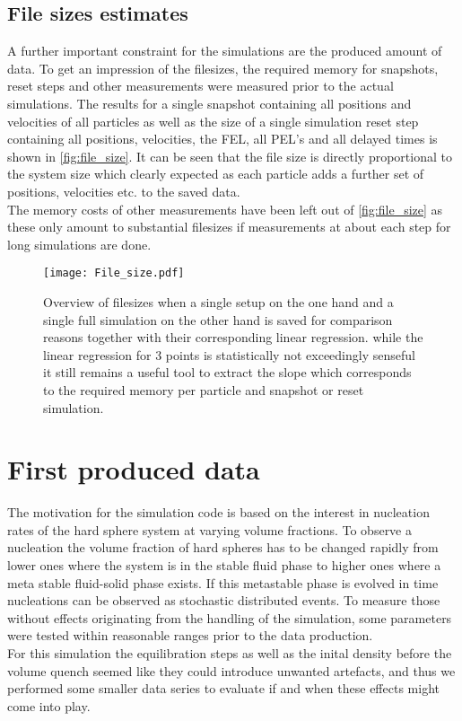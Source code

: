 \subsection{File sizes estimates}
\label{sec:file_size}
A further important constraint for the simulations are the produced amount of data. To get an impression of the filesizes, the required memory for snapshots, reset steps and other measurements were measured prior to the actual simulations. The results for a single snapshot containing all positions and velocities of all particles as well as the size of a single simulation reset step containing all positions, velocities, the FEL, all PEL's and all delayed times is shown in \autoref{fig:file_size}. It can be seen that the file size is directly proportional to the system size which clearly expected as each particle adds a further set of positions, velocities etc. to the saved data.\\
The memory costs of other measurements have been left out of \autoref{fig:file_size} as these only amount to substantial filesizes if measurements at about each step for long simulations are done.\\  

\begin{figure}[h!]
\centering
\texttt{[image: File\_size.pdf]}
\caption{Overview of filesizes when a single setup on the one hand and a single full simulation on the other hand is saved for comparison reasons together with their corresponding linear regression. while the linear regression for 3 points is statistically not exceedingly senseful it still remains a useful tool to extract the slope which corresponds to the required memory per particle and snapshot or reset simulation.}
\label{fig:file_size}
\end{figure}




\section{First produced data}
\label{sec:data}
The motivation for the simulation code is based on the interest in nucleation rates of the hard sphere system at varying volume fractions. To observe a nucleation the volume fraction of hard spheres has to be changed rapidly from lower ones where the system is in the stable fluid phase to higher ones where a meta stable fluid-solid phase exists. If this metastable phase is evolved in time nucleations can be observed as stochastic distributed events. To measure those without effects originating from the handling of the simulation, some parameters were tested within reasonable ranges prior to the data production.\\
For this simulation the equilibration steps as well as the inital density before the volume quench seemed like they could introduce unwanted artefacts, and thus we performed some smaller data series to evaluate if and when these effects might come into play.\\

